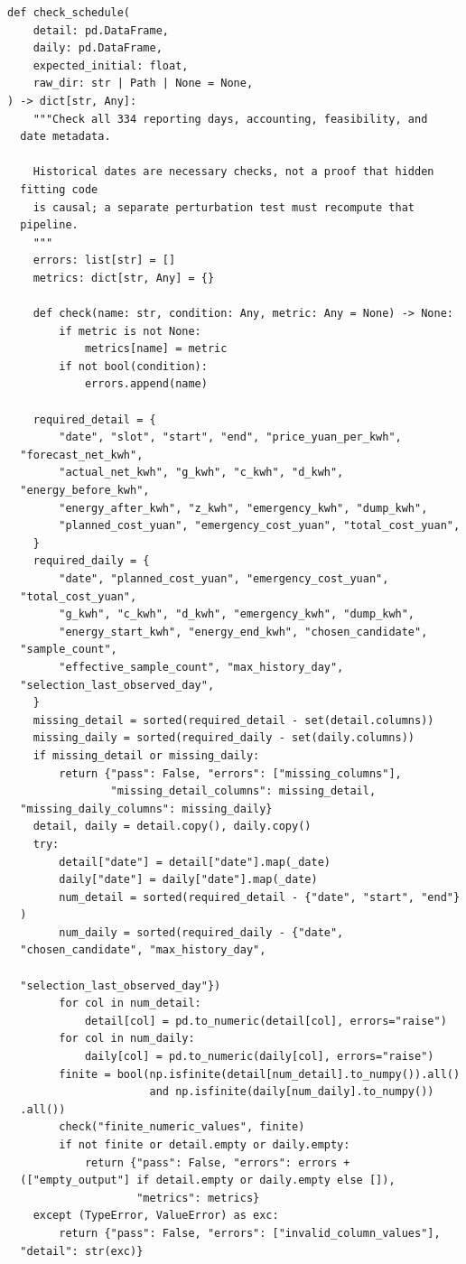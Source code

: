 \begin{verbatim}
def check_schedule(
    detail: pd.DataFrame,
    daily: pd.DataFrame,
    expected_initial: float,
    raw_dir: str | Path | None = None,
) -> dict[str, Any]:
    """Check all 334 reporting days, accounting, feasibility, and
  date metadata.

    Historical dates are necessary checks, not a proof that hidden
  fitting code
    is causal; a separate perturbation test must recompute that
  pipeline.
    """
    errors: list[str] = []
    metrics: dict[str, Any] = {}

    def check(name: str, condition: Any, metric: Any = None) -> None:
        if metric is not None:
            metrics[name] = metric
        if not bool(condition):
            errors.append(name)

    required_detail = {
        "date", "slot", "start", "end", "price_yuan_per_kwh",
  "forecast_net_kwh",
        "actual_net_kwh", "g_kwh", "c_kwh", "d_kwh",
  "energy_before_kwh",
        "energy_after_kwh", "z_kwh", "emergency_kwh", "dump_kwh",
        "planned_cost_yuan", "emergency_cost_yuan", "total_cost_yuan",
    }
    required_daily = {
        "date", "planned_cost_yuan", "emergency_cost_yuan",
  "total_cost_yuan",
        "g_kwh", "c_kwh", "d_kwh", "emergency_kwh", "dump_kwh",
        "energy_start_kwh", "energy_end_kwh", "chosen_candidate",
  "sample_count",
        "effective_sample_count", "max_history_day",
  "selection_last_observed_day",
    }
    missing_detail = sorted(required_detail - set(detail.columns))
    missing_daily = sorted(required_daily - set(daily.columns))
    if missing_detail or missing_daily:
        return {"pass": False, "errors": ["missing_columns"],
                "missing_detail_columns": missing_detail,
  "missing_daily_columns": missing_daily}
    detail, daily = detail.copy(), daily.copy()
    try:
        detail["date"] = detail["date"].map(_date)
        daily["date"] = daily["date"].map(_date)
        num_detail = sorted(required_detail - {"date", "start", "end"}
  )
        num_daily = sorted(required_daily - {"date",
  "chosen_candidate", "max_history_day",

  "selection_last_observed_day"})
        for col in num_detail:
            detail[col] = pd.to_numeric(detail[col], errors="raise")
        for col in num_daily:
            daily[col] = pd.to_numeric(daily[col], errors="raise")
        finite = bool(np.isfinite(detail[num_detail].to_numpy()).all()
                      and np.isfinite(daily[num_daily].to_numpy())
  .all())
        check("finite_numeric_values", finite)
        if not finite or detail.empty or daily.empty:
            return {"pass": False, "errors": errors +
  (["empty_output"] if detail.empty or daily.empty else []),
                    "metrics": metrics}
    except (TypeError, ValueError) as exc:
        return {"pass": False, "errors": ["invalid_column_values"],
  "detail": str(exc)}


\end{verbatim}
